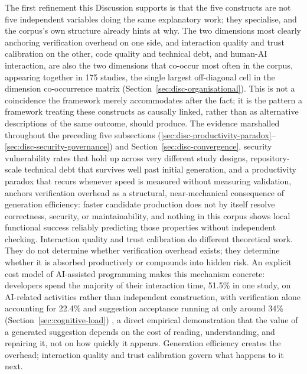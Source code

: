 The first refinement this Discussion supports is that the five constructs are not five independent variables doing the same explanatory work; they specialise, and the corpus's own structure already hints at why. The two dimensions most clearly anchoring verification overhead on one side, and interaction quality and trust calibration on the other, code quality and technical debt, and human-AI interaction, are also the two dimensions that co-occur most often in the corpus, appearing together in 175 studies, the single largest off-diagonal cell in the dimension co-occurrence matrix (Section~\ref{sec:disc-organisational}). This is not a coincidence the framework merely accommodates after the fact; it is the pattern a framework treating these constructs as causally linked, rather than as alternative descriptions of the same outcome, should produce. The evidence marshalled throughout the preceding five subsections (\ref{sec:disc-productivity-paradox}--\ref{sec:disc-security-governance}) and Section~\ref{sec:disc-convergence}, security vulnerability rates that hold up across very different study designs, repository-scale technical debt that survives well past initial generation, and a productivity paradox that recurs whenever speed is measured without measuring validation, anchors verification overhead as a structural, near-mechanical consequence of generation efficiency: faster candidate production does not by itself resolve correctness, security, or maintainability, and nothing in this corpus shows local functional success reliably predicting those properties without independent checking. Interaction quality and trust calibration do different theoretical work. They do not determine whether verification overhead exists; they determine whether it is absorbed productively or compounds into hidden risk. An explicit cost model of AI-assisted programming makes this mechanism concrete: developers spend the majority of their interaction time, 51.5\% in one study, on AI-related activities rather than independent construction, with verification alone accounting for 22.4\% and suggestion acceptance running at only around 34\% (Section~\ref{sec:cognitive-load}) \cite{mozannar_reading_2024}, a direct empirical demonstration that the value of a generated suggestion depends on the cost of reading, understanding, and repairing it, not on how quickly it appears. Generation efficiency creates the overhead; interaction quality and trust calibration govern what happens to it next.

